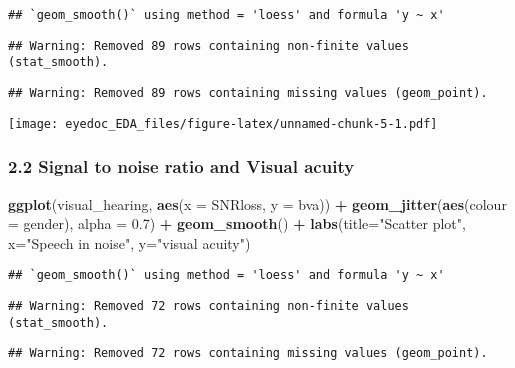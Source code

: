 \documentclass[]{article}
\newenvironment{Shaded}{\begin{snugshade}}{\end{snugshade}}
\newcommand{\DataTypeTok}[1]{\textcolor[rgb]{0.13,0.29,0.53}{#1}}
\newcommand{\FloatTok}[1]{\textcolor[rgb]{0.00,0.00,0.81}{#1}}
\newcommand{\KeywordTok}[1]{\textcolor[rgb]{0.13,0.29,0.53}{\textbf{#1}}}
\newcommand{\NormalTok}[1]{#1}
\newcommand{\OperatorTok}[1]{\textcolor[rgb]{0.81,0.36,0.00}{\textbf{#1}}}
\newcommand{\StringTok}[1]{\textcolor[rgb]{0.31,0.60,0.02}{#1}}
\begin{document}
\begin{verbatim}
## `geom_smooth()` using method = 'loess' and formula 'y ~ x'
\end{verbatim}

\begin{verbatim}
## Warning: Removed 89 rows containing non-finite values (stat_smooth).
\end{verbatim}

\begin{verbatim}
## Warning: Removed 89 rows containing missing values (geom_point).
\end{verbatim}

\texttt{[image: eyedoc\_EDA\_files/figure-latex/unnamed-chunk-5-1.pdf]}

\hypertarget{signal-to-noise-ratio-and-visual-acuity}{%
\subsubsection{2.2 Signal to noise ratio and Visual
acuity}\label{signal-to-noise-ratio-and-visual-acuity}}

\begin{Shaded}
\begin{Highlighting}[]
\KeywordTok{ggplot}\NormalTok{(visual_hearing, }\KeywordTok{aes}\NormalTok{(}\DataTypeTok{x =}\NormalTok{ SNRloss, }\DataTypeTok{y =}\NormalTok{ bva)) }\OperatorTok{+}
\StringTok{    }\KeywordTok{geom_jitter}\NormalTok{(}\KeywordTok{aes}\NormalTok{(}\DataTypeTok{colour =}\NormalTok{ gender), }\DataTypeTok{alpha =} \FloatTok{0.7}\NormalTok{) }\OperatorTok{+}
\StringTok{    }\KeywordTok{geom_smooth}\NormalTok{() }\OperatorTok{+}
\StringTok{    }\KeywordTok{labs}\NormalTok{(}\DataTypeTok{title=}\StringTok{"Scatter plot"}\NormalTok{, }\DataTypeTok{x=}\StringTok{"Speech in noise"}\NormalTok{, }\DataTypeTok{y=}\StringTok{"visual acuity"}\NormalTok{)}
\end{Highlighting}
\end{Shaded}

\begin{verbatim}
## `geom_smooth()` using method = 'loess' and formula 'y ~ x'
\end{verbatim}

\begin{verbatim}
## Warning: Removed 72 rows containing non-finite values (stat_smooth).
\end{verbatim}

\begin{verbatim}
## Warning: Removed 72 rows containing missing values (geom_point).
\end{verbatim}
\end{document}
